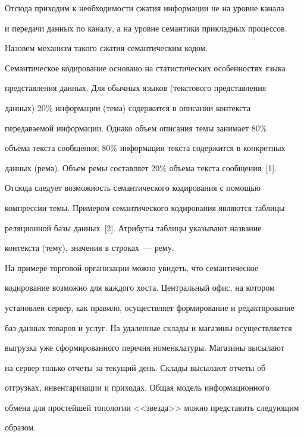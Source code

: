   Отсюда приходим к необходимости сжатия информации не на уровне канала 


и передачи данных по каналу, а на уровне семантики прикладных процессов. 


Назовем механизм такого сжатия семантическим кодом. 


  


  Семантическое кодирование основано на статистических особенностях языка 


представления данных. Для обычных языков (текстового представления 


данных) 20\% информации (тема) содержится в описании контекста 


передаваемой информации. Однако объем описания темы занимает 80\% 


объема текста сообщения; 80\% информации текста содержится в конкретных 


данных (рема). Объем ремы составляет 20\% объема текста сообщения~[1]. 


Отсюда следует возможность семантического кодирования с помощью 


компрессии темы. Примером семантического кодирования являются таблицы 


реляционной базы данных~[2]. Атрибуты таблицы указывают название 


контекста (тему), значения в строках~--- рему. 


  


  На примере торговой организации можно увидеть, что семантическое 


кодирование возможно для каждого хоста. Центральный офис, на котором 


установлен сервер, как правило, осуществляет формирование и редактирование 


баз данных товаров и услуг. На удаленные склады и магазины осуществляется 


выгрузка уже сформированного перечня номенклатуры. Магазины высылают 


на сервер только отчеты за текущий день. Склады высылают отчеты об 


отгрузках, инвентаризации и приходах. Общая модель информационного 


обмена для простейшей топологии <<звезда>> можно представить следующим 


образом. 


  


